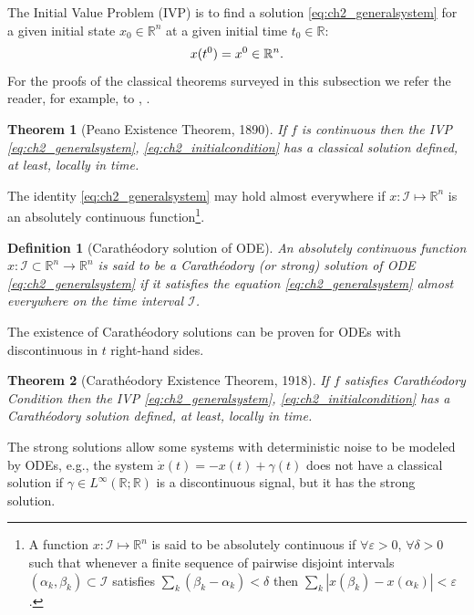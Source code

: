 \documentclass{article}
\newcommand{\R}{\mathbb{R}}
\newtheorem{theorem}{Theorem}
\newtheorem{definition}{Definition}
\begin{document}
 The Initial Value Problem (IVP)  is to find  a solution  \eqref{eq:ch2_generalsystem}
for a given  initial state $x_0\in \R^n$ at a given initial time $t_0\in\R$:\vspace{-1mm}
\begin{equation} \label{eq:ch2_initialcondition}
	x(t^0)=x^0\in \R^n.\vspace{-1mm}
\end{equation} 
For the proofs of the classical theorems surveyed  in  this subsection we refer the reader, for example, to \cite{CoddingtonLevinson1955:Book}, \cite{Filippov1988:Book}.
\begin{theorem}[\small Peano Existence Theorem, 1890]\label{Thm:Piano} 
	\itshape If $f$ is continuous then 
	the IVP \eqref{eq:ch2_generalsystem}, \eqref{eq:ch2_initialcondition} has a classical solution defined, at least, locally in time.
\end{theorem}


The identity \eqref{eq:ch2_generalsystem} may hold almost everywhere  if $x : \mathcal{I} \mapsto \R^n$ is an {absolutely continuous function}\footnote{A function $x: \mathcal{I}\mapsto \R^n$ is said to be absolutely continuous if $\forall \varepsilon>0$, $\forall \delta>0$ such that whenever a finite sequence of pairwise disjoint intervals $(\alpha_k,\beta_k)\subset \mathcal{I}$ satisfies $ \sum_k(\beta_k-\alpha_k)<\delta$ then $\sum_k |x(\beta_k)-x(\alpha_k)|<\varepsilon$.}.
\begin{definition}[\small Carath\'{e}odory solution of ODE]\;\itshape
	An absolutely continuous function $ x : \mathcal{I}\subset \R^n \to \R^n$  is said to be  a  Carath\'{e}odory (or strong) solution of ODE \eqref{eq:ch2_generalsystem} if  it satisfies the equation \eqref{eq:ch2_generalsystem} almost everywhere on the time interval $\mathcal{I}$.
\end{definition}

The existence of Carath\'{e}odory solutions can be proven for ODEs with discontinuous in $t$ right-hand sides.
\begin{theorem}[\small Carath\'{e}odory Existence Theorem, 1918]\label{Theorem:Car}\hfill\newline
\itshape If $f$ satisfies Carath\'{e}odory Condition then the IVP \eqref{eq:ch2_generalsystem}, \eqref{eq:ch2_initialcondition} has a Carath\'{e}odory solution  defined, at least, locally in time.
\end{theorem}

The strong solutions allow some systems with deterministic noise to be modeled by ODEs, e.g.,  the system $\dot x(t)=-x(t)+\gamma(t)$ does not have a classical solution if $\gamma\in L^{\infty}(\R;\R)$ is a discontinuous signal, but it has the strong solution. 
\end{document}
